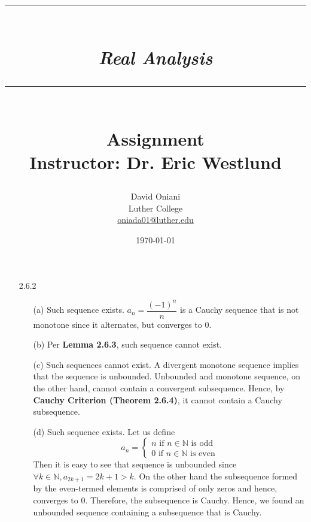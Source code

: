 \documentclass[11pt]{article}
\author{David Oniani\\
        Luther College\\
        \href{mailto:oniada01@luther.edu}{oniada01@luther.edu}}
\title{\rule{\paperwidth - 150pt}{1pt}\textbf{\\\textit{Real Analysis}\\}\rule
{\paperwidth - 150pt}{1pt}\\\textbf{Assignment \textnumero3}\\{\normalsize
Instructor: Dr. Eric Westlund}}
\date{\today}
\newcommand{\nats}{\mathbb{N}}
\begin{document}
\maketitle

%
%
%

\begin{itemize}
    \item[2.6.2]
        \begin{itemize}
            \item[(a)]
                Such sequence exists. $a_n = \dfrac{(-1)^n}{n}$ is a Cauchy
                sequence that is not monotone since it alternates, but
                converges to $0$.

            \item[(b)]
                Per \textbf{Lemma 2.6.3}, such sequence cannot exist.

            \item[(c)]
                Such sequences cannot exist. A divergent monotone sequence
                implies that the sequence is unbounded. Unbounded and monotone
                sequence, on the other hand, cannot contain a convergent
                subsequence. Hence, by \textbf{Cauchy Criterion (Theorem
                2.6.4)}, it cannot contain a Cauchy subsequence.

            \item[(d)]
                Such sequence exists. Let us define
                \begin{equation*}
                    a_n =
                    \begin{cases}
                        n \text{ if } n \in \nats \text{ is odd}\\
                        0 \text{ if } n \in \nats \text{ is even}
                    \end{cases}
                \end{equation*}
                Then it is easy to see that sequence is unbounded since
                $\forall k \in \nats, a_{2k + 1} = 2k + 1 > k$. On the other
                hand the subsequence formed by the even-termed elements is
                comprised of only zeros and hence, converges to $0$. Therefore,
                the subsequence is Cauchy. Hence, we found an unbounded
                sequence containing a subsequence that is Cauchy.
        \end{itemize}


\end{itemize}
\end{document}

